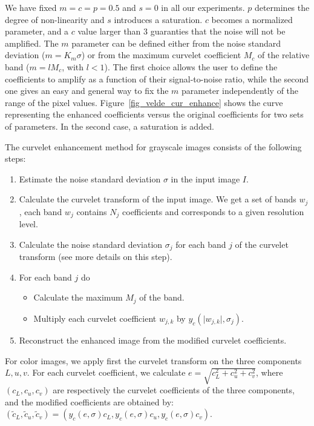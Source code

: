 We have fixed $m=c=p=0.5$ and $s=0$ in all our experiments. $p$ determines 
the
degree of non-linearity and $s$ introduces a saturation.
$c$ becomes a normalized parameter, and a $c$ value larger than $3$ 
guaranties that the noise 
will not be amplified. The $m$ parameter can be defined either from
the noise standard deviation ($m = K_m \sigma$) or from the maximum curvelet
coefficient $M_c$ of the relative band ($m = l M_c$, with $l < 1$). The first
choice allows the user to define the coefficients to amplify as a function
of their signal-to-noise ratio, while the second one gives an easy    
and general way to fix the $m$ parameter independently of the range of the
pixel values. Figure~\ref{fig_velde_cur_enhance} shows the curve representing
the enhanced coefficients versus the original coefficients for two
sets of parameters. In the second case, a saturation is added.

The curvelet enhancement method for grayscale images consists of 
the following steps:
\begin{enumerate}
\item Estimate the noise standard deviation $\sigma$ in the input
image $I$.
\item Calculate the curvelet transform of the input image. We get a set 
of bands $w_{j}$, each band $w_j$ contains $N_j$ coefficients 
and corresponds to a given resolution level. 
\item Calculate the noise  standard deviation $\sigma_j$ for each
band $j$ of the curvelet transform (see \cite{starck:sta01_3} more
details on this step).
\item For each band $j$ do
\begin{itemize}
\item Calculate the maximum $M_j$ of the band.
\item Multiply each curvelet coefficient $w_{j,k}$ by $y_c(\mid w_{j,k} \mid ,\sigma_j)$.
\end{itemize}
\item Reconstruct the enhanced image from the modified curvelet coefficients.
\end{enumerate}

For color images, we apply first the curvelet transform on the
three components $L,u,v$. For each cur\-velet coef\-fi\-cient, we  
cal\-cu\-la\-te $e = \sqrt{ c_L^2 + c_u^2 + c_v^2}$, where $(c_L, c_u, c_v)$
are respectively the curvelet coefficients of the three components,
and the mo\-di\-fied coef\-fi\-cients are obtained by:
$(\tilde c_L, \tilde  c_u, \tilde c_v) = 
(y_c(e, \sigma)c_L , y_c(e, \sigma)c_u, y_c(e, \sigma)c_v)$. 

